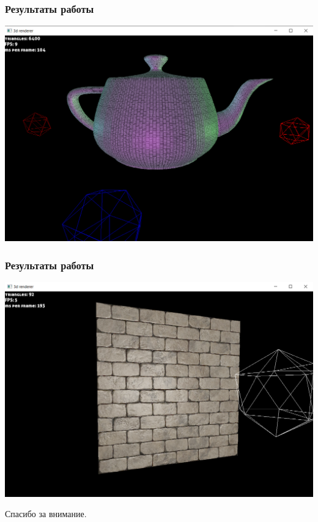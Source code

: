\documentclass{beamer}
\begin{document}
\begin{frame}
	\frametitle{Результаты работы}
	\includegraphics[scale=0.4]{img4.png} 
	
\end{frame}

\begin{frame}
	\frametitle{Результаты работы}
	\includegraphics[scale=0.4]{img5.png} 
	
\end{frame}
	
	\begin{frame}
		Спасибо за внимание. 
		
	\end{frame}
	
\end{document}
